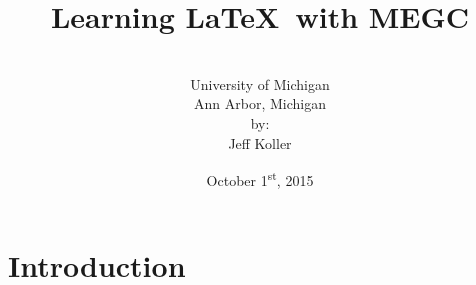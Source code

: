 \documentclass[]{article}%
\theoremstyle{definition}
\begin{document}

\title{Learning \LaTeX\ with MEGC}
\author{\vspace{.75 in} \\University of Michigan \\  Ann Arbor, Michigan \vspace{.25 in} \\by: \\Jeff Koller \vspace{1 in} } 
\date{October 1\textsuperscript{st}, 2015}
\maketitle				%
\thispagestyle{empty} 	%
\clearpage				%



\section{Introduction}
\end{document}
